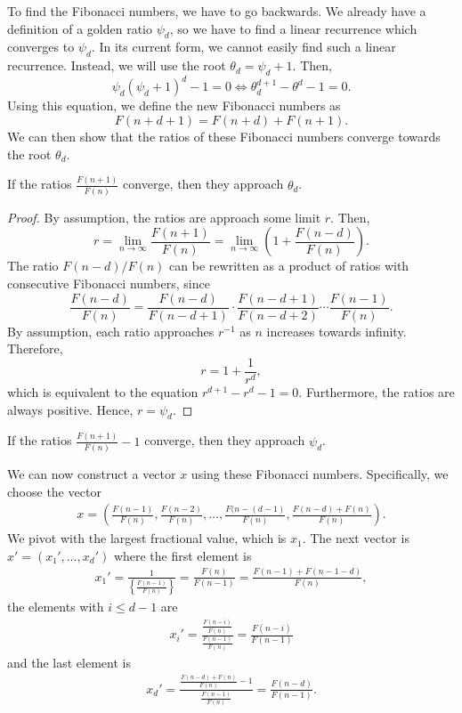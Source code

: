 To find the Fibonacci numbers, we have to go backwards.
We already have a definition of a golden ratio $ψ_d$,
so we have to find a linear recurrence which converges to $ψ_d$.
In its current form, we cannot easily find such a linear recurrence.
Instead, we will use the root $θ_d = ψ_d + 1$.
Then,
\[
  ψ_d (ψ_d + 1)^d - 1 = 0
  \iff
  θ_d^{d+1} - θ^d - 1 = 0.
\]
Using this equation, we define the new Fibonacci numbers as
\[
  F(n + d + 1) = F(n + d) + F(n + 1).
\]
We can then show that the ratios of these Fibonacci numbers converge towards the root $θ_d$.

\begin{theorem}
  If the ratios $\frac{F(n+1)}{F(n)}$ converge, then they approach $θ_d$.
\end{theorem}

\begin{proof}
  By assumption, the ratios are approach some limit $r$.
  Then,
  \[
    r
    = \lim_{n → ∞} \frac{F(n+1)}{F(n)}
    = \lim_{n → ∞} \left(1 + \frac{F(n-d)}{F(n)}\right).
  \]
  The ratio $F(n-d)/F(n)$ can be rewritten as a product of ratios with
  consecutive Fibonacci numbers, since
  \[
    \frac{F(n - d)}{F(n)}
    = \frac{F(n - d)}{F(n - d + 1)} · \frac{F(n - d + 1)}{F(n - d + 2)} ⋯ \frac{F(n - 1)}{F(n)}.
  \]
  By assumption, each ratio approaches $r^{-1}$ as $n$ increases towards infinity.
  Therefore,
  \[
    r = 1 + \frac{1}{r^d},
  \]
  which is equivalent to the equation $r^{d+1} - r^d - 1 = 0$.
  Furthermore, the ratios are always positive.
  Hence, $r = ψ_d$.
\end{proof}

\begin{corollary}
  If the ratios $\frac{F(n+1)}{F(n)} - 1$ converge, then they approach $ψ_d$.
\end{corollary}

We can now construct a vector $x$ using these Fibonacci numbers.
Specifically, we choose the vector
\begin{align*}
  x = \left(
    \frac{F(n-1)}{F(n)},
    \frac{F(n-2)}{F(n)},
    …,
    \frac{F(n-(d-1)}{F(n)},
    \frac{F(n-d) + F(n)}{F(n)} \right).
\end{align*}
We pivot with the largest fractional value, which is $x_1$.
The next vector is $x' = (x₁', …, x_d')$ where
the first element is
\begin{align*}
  x_1'
  = \frac{1}{\left\{\frac{F(n-1)}{F(n)}\right\}}
  = \frac{F(n)}{F(n-1)}
  = \frac{F(n-1) + F(n-1-d)}{F(n)},
\end{align*}
the elements with $i ≤ d - 1$ are
\begin{align*}
  x_i'
  = \frac{\frac{F(n-i)}{F(n)}}{\frac{F(n-1)}{F(n)}}
  = \frac{F(n-i)}{F(n-1)}
\end{align*}
and the last element is
\begin{align*}
  x_d'
  = \frac{\frac{F(n-d) + F(n)}{F(n)} - 1}{\frac{F(n-1)}{F(n)}}
  = \frac{F(n-d)}{F(n-1)}.
\end{align*}

